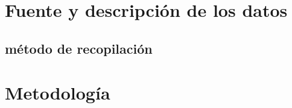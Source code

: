 \chapter{Fuente y descripción de los datos}

\section{método de recopilación}


\chapter{Metodología}